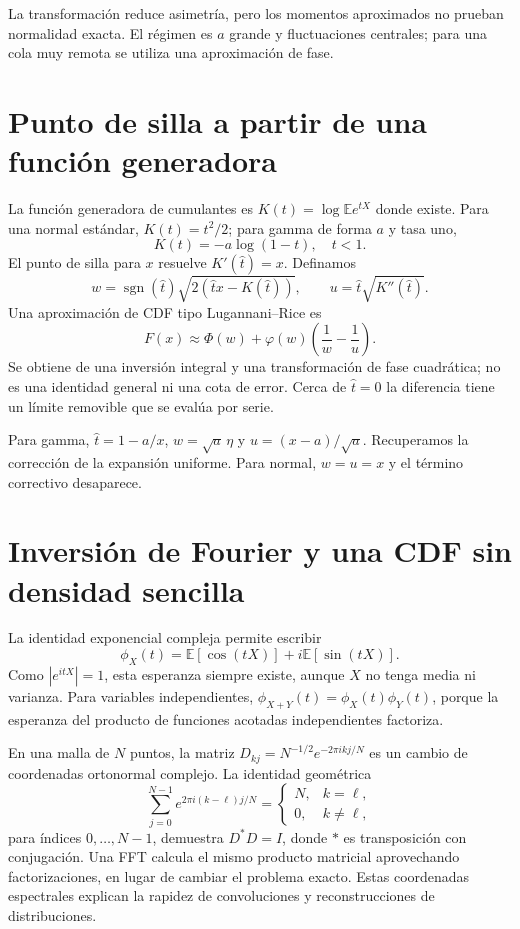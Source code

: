\documentclass[11pt,a4paper]{article}
\newcommand{\E}{\mathbb E}
\theoremstyle{definition}
\DeclareMathOperator{\sgn}{sgn}
\newcommand{\ph}{\varphi}
\newcounter{problema}
\begin{document}
La transformación reduce asimetría, pero los momentos aproximados no prueban normalidad exacta. El régimen es $a$ grande y fluctuaciones centrales; para una cola muy remota se utiliza una aproximación de fase.

\section{Punto de silla a partir de una función generadora}
La función generadora de cumulantes es $K(t)=\log\E e^{tX}$ donde existe. Para una normal estándar, $K(t)=t^2/2$; para gamma de forma $a$ y tasa uno,
\[
K(t)=-a\log(1-t),\quad t<1.
\]
El punto de silla para $x$ resuelve $K'(\widehat t)=x$. Definamos
\[
w=\sgn(\widehat t)\sqrt{2(\widehat tx-K(\widehat t))},
\qquad u=\widehat t\sqrt{K''(\widehat t)}.
\]
Una aproximación de CDF tipo Lugannani--Rice es
\[
F(x)\approx\Phi(w)+\ph(w)\left(\frac1w-\frac1u\right).
\]
Se obtiene de una inversión integral y una transformación de fase cuadrática; no es una identidad general ni una cota de error. Cerca de $\widehat t=0$ la diferencia tiene un límite removible que se evalúa por serie.

Para gamma, $\widehat t=1-a/x$, $w=\sqrt a\,\eta$ y $u=(x-a)/\sqrt a$. Recuperamos la corrección de la expansión uniforme. Para normal, $w=u=x$ y el término correctivo desaparece.

\section{Inversión de Fourier y una CDF sin densidad sencilla}

La identidad exponencial compleja permite escribir
\[
\phi_X(t)=\E[\cos(tX)]+i\E[\sin(tX)].
\]
Como $|e^{itX}|=1$, esta esperanza siempre existe, aunque $X$ no tenga media ni varianza. Para variables independientes,
$\phi_{X+Y}(t)=\phi_X(t)\phi_Y(t)$, porque la esperanza del producto de funciones acotadas independientes factoriza.

En una malla de $N$ puntos, la matriz
$D_{kj}=N^{-1/2}e^{-2\pi i kj/N}$ es un cambio de coordenadas ortonormal complejo. La identidad geométrica
\[
\sum_{j=0}^{N-1}e^{2\pi i(k-\ell)j/N}
=\begin{cases}N,&k=\ell,\\0,&k\ne\ell,\end{cases}
\]
para índices $0,\ldots,N-1$, demuestra $D^\ast D=I$, donde $\ast$ es transposición con conjugación. Una FFT calcula el mismo producto matricial aprovechando factorizaciones, en lugar de cambiar el problema exacto. Estas coordenadas espectrales explican la rapidez de convoluciones y reconstrucciones de distribuciones.
\end{document}
